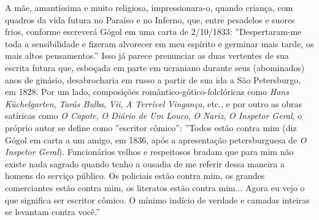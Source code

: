 A mãe, amantíssima e muito religiosa, impressionara-o, quando criança,
com quadros da vida futura no Paraíso e no Inferno, que, entre pesadelos
e suores frios, conforme escreverá Gógol em uma carta de 2/10/1833:
''Despertaram-me toda a sensibilidade e fizeram alvorecer em meu
espírito e germinar mais tarde, os mais altos pensamentos.'' Isso já
parece prenunciar as duas vertentes de sua escrita futura que, esboçada
em parte em ucraniano durante seus (abominados) anos de ginásio,
desabrocharia em russo a partir de sua ida a São Petersburgo, em 1828.
Por um lado, composições romântico-gótico-folclóricas como \emph{Hans
Küchelgarten}, \emph{Tarás Bulba}, \emph{Vii}, \emph{A Terrível
Vingança}, etc., e por outro as obras satíricas como \emph{O Capote},
\emph{O Diário de Um Louco}, \emph{O Nariz}, \emph{O Inspetor Geral}, o
próprio autor se define como ''escritor cômico'': ''Todos estão contra
mim (diz Gógol em carta a um amigo, em 1836, após a apresentação
petersburguesa de \emph{O Inspetor Geral}). Funcionários velhos e
respeitosos bradam que para mim não existe nada sagrado quando tenho a
ousadia de me referir dessa maneira a homens do serviço público. Os
policiais estão contra mim, os grandes comerciantes estão contra mim, os
literatos estão contra mim... Agora eu vejo o que significa ser escritor
cômico. O mínimo indício de verdade e camadas inteiras se levantam
contra você.''


